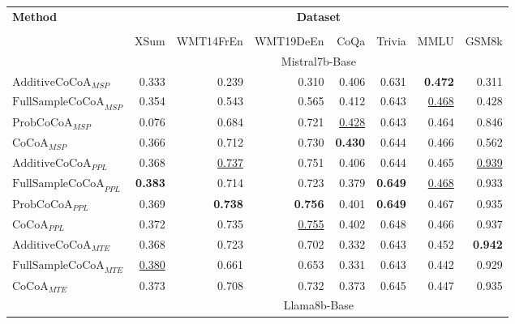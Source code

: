\begin{table*}[h!]
\footnotesize
\centering

\begin{tabular}{lrrrrrrr}
\toprule
    \multirow{2}{*}{\textbf{Method}}  & \multicolumn{7}{c}{\textbf{Dataset}}  \\ 
      \cmidrule(lr){2-8}  \\
  & XSum & WMT14FrEn & WMT19DeEn & CoQa & Trivia & MMLU & GSM8k \\
  \midrule

\rowcolor[gray]{0.9} & \multicolumn{7}{c}{Mistral7b-Base} \\

\midrule

$\text{AdditiveCoCoA}_{MSP}$ & 0.333& 0.239& 0.310& 0.406& 0.631& \textbf{0.472}& 0.311\\
$\text{FullSampleCoCoA}_{MSP}$ & 0.354& 0.543& 0.565& 0.412& 0.643& \underline{0.468}& 0.428\\
$\text{ProbCoCoA}_{MSP}$ & 0.076& 0.684& 0.721& \underline{0.428}& 0.643& 0.464& 0.846\\
$\text{CoCoA}_{MSP}$ & 0.366& 0.712& 0.730& \textbf{0.430}& 0.644& 0.466& 0.562\\

\midrule

$\text{AdditiveCoCoA}_{PPL}$ & 0.368& \underline{0.737}& 0.751& 0.406& 0.644& 0.465& \underline{0.939}\\
$\text{FullSampleCoCoA}_{PPL}$ & \textbf{0.383}& 0.714& 0.723& 0.379& \textbf{0.649}& \underline{0.468}& 0.933\\
$\text{ProbCoCoA}_{PPL}$ & 0.369& \textbf{0.738}& \textbf{0.756}& 0.401& \textbf{0.649}& 0.467& 0.935\\
$\text{CoCoA}_{PPL}$ & 0.372& 0.735& \underline{0.755}& 0.402& 0.648& 0.466& 0.937\\

\midrule

$\text{AdditiveCoCoA}_{MTE}$ & 0.368& 0.723& 0.702& 0.332& 0.643& 0.452& \textbf{0.942}\\
$\text{FullSampleCoCoA}_{MTE}$ & \underline{0.380}& 0.661& 0.653& 0.331& 0.643& 0.442& 0.929\\
$\text{CoCoA}_{MTE}$ & 0.373& 0.708& 0.732& 0.373& 0.645& 0.447& 0.935\\
\midrule

\rowcolor[gray]{0.9} & \multicolumn{7}{c}{Llama8b-Base} \\

\midrule


\end{tabular}
\end{table*}
